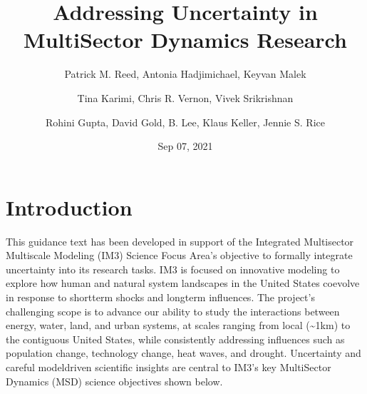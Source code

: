 \documentclass[letterpaper,10pt,english]{book}
\title{\textbf{Addressing Uncertainty in MultiSector Dynamics Research}}
\date{Sep 07, 2021}
\author{Patrick M. Reed, Antonia Hadjimichael, Keyvan Malek\and Tina Karimi, Chris R. Vernon, Vivek Srikrishnan\and Rohini Gupta, David Gold, B. Lee, Klaus Keller, Jennie S. Rice}
\begin{document}
\pagestyle{empty}
\sphinxmaketitle
\pagestyle{plain}
\sphinxtableofcontents
\pagestyle{normal}
\label{\detokenize{index::doc}}



\chapter{Introduction}
\label{\detokenize{1_introduction:introduction}}\label{\detokenize{1_introduction:id1}}\label{\detokenize{1_introduction::doc}}
\sphinxAtStartPar
This guidance text has been developed in support of the Integrated Multisector Multiscale Modeling (IM3) Science Focus Area’s objective to formally integrate uncertainty into its research tasks. IM3 is focused on innovative modeling to explore how human and natural system landscapes in the United States co\sphinxhyphen{}evolve in response to short\sphinxhyphen{}term shocks and long\sphinxhyphen{}term influences. The project’s challenging scope is to advance our ability to study the interactions between energy, water, land, and urban systems, at scales ranging from local (\textasciitilde{}1km) to the contiguous United States, while consistently addressing influences such as population change, technology change, heat waves, and drought. Uncertainty and careful model\sphinxhyphen{}driven scientific insights are central to IM3’s key MultiSector Dynamics (MSD) science objectives shown below.

\sphinxAtStartPar
{}

\sphinxAtStartPar
{}

\sphinxAtStartPar
{}

\sphinxAtStartPar
{}
\end{document}
